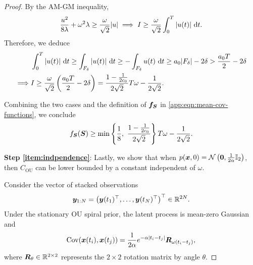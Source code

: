 \begin{proof}
By the AM-GM inequality,
\begin{equation*}
    \frac{u^2}{8\lambda}+\omega^2\lambda
    \geq
    \frac{\omega}{\sqrt{2}}|u| \implies 
    I \geq \frac{\omega}{\sqrt{2}}\int_0^{T}|u(t)|\,\mathop{}\!\mathrm{d} t.
\end{equation*}
Therefore, we deduce
\begin{equation*}
\begin{aligned}
    &\int_0^{T} |u(t)|\,\mathop{}\!\mathrm{d} t
    \geq
    \int_{F_\delta}|u(t)|\,\mathop{}\!\mathrm{d} t
    \geq
    -\int_{F_\delta}u(t)\,\mathop{}\!\mathrm{d} t
    \geq
    a_0 |F_\delta| - 2\delta
    >
    \frac{a_0 T}{2} - 2\delta\\
    \implies&I
    \geq
    \frac{\omega}{\sqrt{2}}
    \left(
        \frac{a_0 T}{2} - 2\delta
    \right)
    =
    \frac{1-\frac{1}{2c_0}}{2\sqrt{2}} T\omega
    -
    \frac{1}{2\sqrt{2}}.
\end{aligned}
\end{equation*}

Combining the two cases and the definition of $\boldsymbol{f}_{\boldsymbol{S}}$ in 
\cref{app:eqn:mean-cov-functions}, we conclude
\begin{equation*}
    f_{\mbS}(\mbS)
    \geq
    \min\left\{
        \frac{1}{8},\ 
        \frac{1-\frac{1}{2c_0}}{2\sqrt{2}}
    \right\}T \omega - \frac{1}{2\sqrt{2}}.
\end{equation*}

\textbf{Step \ref{item:indpendence}}:
Lastly, we show that when $p(\boldsymbol{x},0)=\mathcal{N}\left(\boldsymbol{0},\frac{1}{2\alpha}\mathbb{I}_2\right)$, then $C_{\mathrm{OU}}$ can be lower bounded by a constant independent of $\omega$. 

Consider the vector of stacked observations
\begin{equation*}
    \boldsymbol{y}_{1:N} = \big(\boldsymbol{y}(t_1)^\top, \ldots, \boldsymbol{y}(t_N)^\top\big)^\top \in \mathbb{R}^{2N}.
\end{equation*}
Under the stationary OU spiral prior, the latent process is mean-zero Gaussian and
\begin{equation*}
    \mathrm{Cov}(\boldsymbol{x}(t_i),\boldsymbol{x}(t_j))
    =
    \frac{1}{2\alpha}
    e^{-\alpha |t_i-t_j|}
    \boldsymbol{R}_{\omega(t_i-t_j)},
\end{equation*}
where $\boldsymbol{R}_{\theta} \in \mathbb{R}^{2 \times 2}$ represents the $2 \times 2$ rotation matrix by angle $\theta$.


\end{proof}
